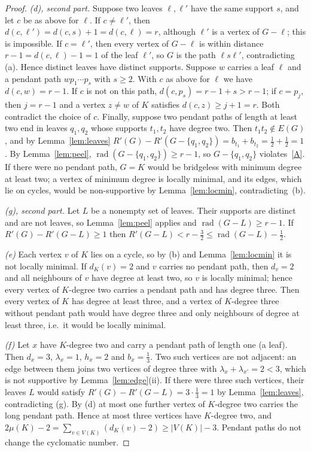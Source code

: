 \documentclass[11pt]{amsart}
\theoremstyle{definition}
\DeclareMathOperator{\rad}{rad}
\newcommand{\Rp}{R'}
\begin{document}
\begin{proof}
\emph{(d), second part.} Suppose two leaves $\ell,\ell'$ have the same support $s$, and let $c$ be as above for $\ell$.
If $c\neq\ell'$, then $d(c,\ell')=d(c,s)+1=d(c,\ell)=r$, although $\ell'$ is a vertex of $G-\ell$; this is impossible.
If $c=\ell'$, then every vertex of $G-\ell$ is within distance $r-1=d(c,\ell)-1=1$ of the leaf $\ell'$, so $G$ is the path
$\ell s\ell'$, contradicting (a). Hence distinct leaves have distinct supports. Suppose $w$
carries a leaf $\ell$ and a pendant path $w p_1\cdots p_s$ with $s\ge2$. With $c$ as above for $\ell$ we have
$d(c,w)=r-1$. If $c$ is not on this path, $d(c,p_s)=r-1+s>r-1$; if $c=p_j$, then $j=r-1$ and a vertex $z\neq w$ of $K$
satisfies $d(c,z)\ge j+1=r$. Both contradict the choice of $c$. Finally, suppose two pendant paths of length at least two
end in leaves $q_1,q_2$ whose supports $t_1,t_2$ have degree two. Then $t_1t_2\notin E(G)$, and by Lemma~\ref{lem:leaves}
$\Rp(G)-\Rp(G-\{q_1,q_2\})=b_{t_1}+b_{t_2}=\frac12+\frac12=1$. By Lemma~\ref{lem:peel}, $\rad(G-\{q_1,q_2\})\ge r-1$,
so $G-\{q_1,q_2\}$ violates~\eqref{A}. If there were no pendant path, $G=K$ would be bridgeless with minimum degree at least
two; a vertex of minimum degree is locally minimal, and its edges, which lie on cycles, would be non-supportive by
Lemma~\ref{lem:locmin}, contradicting~(b).

\emph{(g), second part.} Let $L$ be a nonempty set of leaves. Their supports are distinct and are not leaves, so
Lemma~\ref{lem:peel} applies and $\rad(G-L)\ge r-1$. If $\Rp(G)-\Rp(G-L)\ge1$ then
$\Rp(G-L)<r-\frac32\le\rad(G-L)-\frac12$.

\emph{(e)} Each vertex $v$ of $K$ lies on a cycle, so by (b) and Lemma~\ref{lem:locmin} it is not locally minimal. If
$d_K(v)=2$ and $v$ carries no pendant path, then $d_v=2$ and all neighbours of $v$ have degree at least two, so $v$
is locally minimal; hence every vertex of $K$-degree two carries a pendant path and has degree three. Then every vertex of
$K$ has degree at least three, and a vertex of $K$-degree three without pendant path would have degree three and only
neighbours of degree at least three, i.e.\ it would be locally minimal.

\emph{(f)} Let $x$ have $K$-degree two and carry a pendant path of length one (a leaf). Then $d_x=3$, $\lambda_x=1$,
$h_x=2$ and $b_x=\frac13$. Two such vertices are not adjacent: an edge between them joins two vertices of degree three
with $\lambda_x+\lambda_{x'}=2<3$, which is not supportive by Lemma~\ref{lem:edge}(ii). If there were three such vertices,
their leaves $L$ would satisfy $\Rp(G)-\Rp(G-L)=3\cdot\frac13=1$ by Lemma~\ref{lem:leaves}, contradicting (g). By (d) at
most one further vertex of $K$-degree two carries the long pendant path. Hence at most three vertices have $K$-degree two,
and $2\mu(K)-2=\sum_{v\in V(K)}(d_K(v)-2)\ge|V(K)|-3$. Pendant paths do not change the cyclomatic number.
\end{proof}
\end{document}

